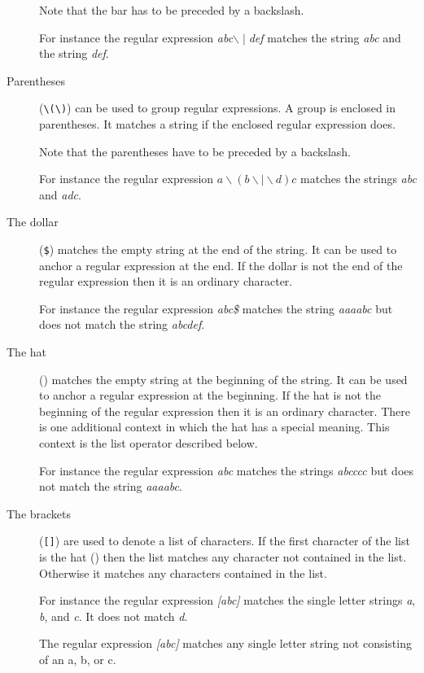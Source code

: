 \documentclass[11pt,a4paper]{scrbook}
\begin{document}
\begin{description}
  Note that the bar has to be preceded by a backslash.
  
  For instance the regular expression \emph{abc\(\backslash\mid\)def} matches
  the string \emph{abc} and the string \emph{def}.

\item[Parentheses] (\verb|\(\)|) can be used to group regular expressions. A
  group is enclosed in parentheses. It matches a string if the enclosed
  regular expression does.

  Note that the parentheses have to be preceded by a backslash.
  
  For instance the regular expression
  \emph{\(a\backslash(b\backslash\mid\backslash d)c\)} matches the strings
  \emph{abc} and \emph{adc}.
  
\item[The dollar] (\verb|$|) %
  matches the empty string at the end of the string. It can be used to anchor
  a regular expression at the end.  If the dollar is not the end of the
  regular expression then it is an ordinary character.

  For instance the regular expression \emph{abc\$} matches the string
  \emph{aaaabc} but does not match the string \emph{abcdef}.
  
\item[The hat] (\texttt{\Hat}) matches the empty string at the beginning of
  the string. It can be used to anchor a regular expression at the beginning.
  If the hat is not the beginning of the regular expression then it is an
  ordinary character. There is one additional context in which the hat has a
  special meaning. This context is the list operator described below.

  For instance the regular expression \emph{\Hat abc} matches the strings
  \emph{abcccc} but does not match the string \emph{aaaabc}.
  
\item[The brackets] (\verb|[]|) are used to denote a list of characters. If
  the first character of the list is the hat (\texttt{\Hat}) then the list
  matches any character not contained in the list. Otherwise it matches any
  characters contained in the list.

  For instance the regular expression \emph{[abc]} matches the single letter
  strings \emph{a}, \emph{b}, and \emph{c}. It does not match \emph{d}.

  The regular expression \emph{[\Hat abc]} matches any single letter string
  not consisting of an a, b, or c.
  

\end{description}
\end{document}
